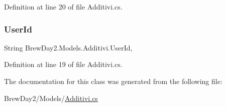 Definition at line 20 of file Additivi.\+cs.

\mbox{\label{class_brew_day2_1_1_models_1_1_additivi_a55604f814455b3f8a1fbc83829e353f0}} 
\subsubsection{\texorpdfstring{User\+Id}{UserId}}
{\footnotesize\ttfamily String Brew\+Day2.\+Models.\+Additivi.\+User\+Id\hspace{0.3cm}{\ttfamily [get]}, {\ttfamily [set]}}



Definition at line 19 of file Additivi.\+cs.



The documentation for this class was generated from the following file\+:\begin{DoxyCompactItemize}
\item 
Brew\+Day2/\+Models/\mbox{\hyperlink{_additivi_8cs}{Additivi.\+cs}}\end{DoxyCompactItemize}

